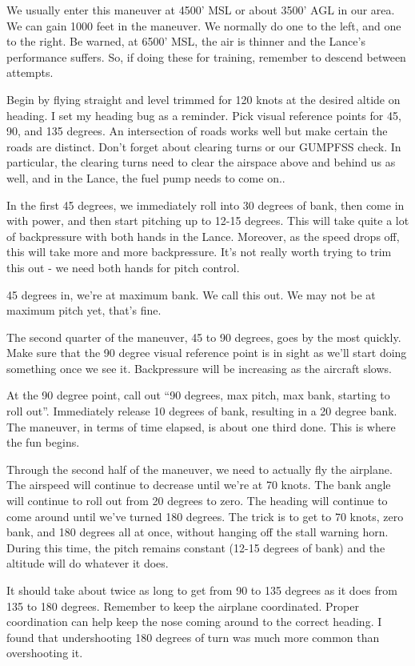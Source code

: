 We usually enter this maneuver at 4500' MSL or about 3500' AGL in our area. We can gain 1000 feet in the maneuver. We normally do one to the left, and one to the right. Be warned, at 6500' MSL, the air is thinner and the Lance's performance suffers. So, if doing these for training, remember to descend between attempts.

Begin by flying straight and level trimmed for 120 knots at the desired altide on heading. I set my heading bug as a reminder. Pick visual reference points for 45, 90, and 135 degrees. An intersection of roads works well but make certain the roads are distinct. Don't forget about clearing turns or our GUMPFSS check. In particular, the clearing turns need to clear the airspace above and behind us as well, and in the Lance, the fuel pump needs to come on..

In the first 45 degrees, we immediately roll into 30 degrees of bank, then come in with power, and then start pitching up to 12-15 degrees. This will take quite a lot of backpressure with both hands in the Lance. Moreover, as the speed drops off, this will take more and more backpressure. It's not really worth trying to trim this out - we need both hands for pitch control.

45 degrees in, we're at maximum bank. We call this out. We may not be at maximum pitch yet, that's fine.

The second quarter of the maneuver, 45 to 90 degrees, goes by the most quickly. Make sure that the 90 degree visual reference point is in sight as we'll start doing something once we see it. Backpressure will be increasing as the aircraft slows.

At the 90 degree point, call out ``90 degrees, max pitch, max bank, starting to roll out''. Immediately release 10 degrees of bank, resulting in a 20 degree bank. The maneuver, in terms of time elapsed, is about one third done. This is where the fun begins.

Through the second half of the maneuver, we need to actually fly the airplane. The airspeed will continue to decrease until we're at 70 knots. The bank angle will continue to roll out from 20 degrees to zero. The heading will continue to come around until we've turned 180 degrees. The trick is to get to 70 knots, zero bank, and 180 degrees all at once, without hanging off the stall warning horn. During this time, the pitch remains constant (12-15 degrees of bank) and the altitude will do whatever it does.

It should take about twice as long to get from 90 to 135 degrees as it does from 135 to 180 degrees. Remember to keep the airplane coordinated. Proper coordination can help keep the nose coming around to the correct heading. I found that undershooting 180 degrees of turn was much more common than overshooting it.

